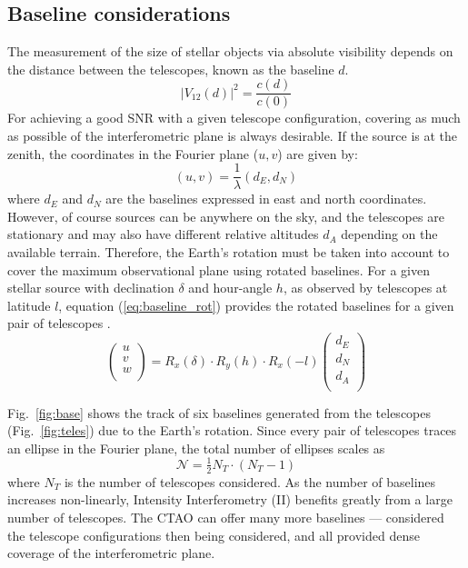 \subsection{Baseline considerations}
The measurement of the size of stellar objects via absolute visibility depends on the distance between the telescopes, known as the baseline $d$.
\begin{equation}
	|V_{12}(d)|^2 = \frac{c(d)}{c(0)}
	\label{eq:angular_size_meas}
\end{equation}
For achieving a good SNR with a given telescope configuration, covering as much as possible of the interferometric plane is always desirable. If the source is at the zenith, the coordinates in the Fourier plane ($u,v$) are given by:
\begin{equation}
	(u,v) = \frac{1}{\lambda} (d_E, d_N)
\end{equation}
where $d_E$ and $d_N$ are the baselines expressed in east and north coordinates. However, of course sources can be anywhere on the sky, and the telescopes are stationary and may also have different relative altitudes $d_A$ depending on the available terrain. Therefore, the Earth's rotation must be taken into account to cover the maximum observational plane using rotated baselines. For a given stellar source with declination $\delta$ and hour-angle $h$, as observed by telescopes at latitude $l$, equation (\ref{eq:baseline_rot}) provides the rotated baselines for a given pair of telescopes \citep[see e.g., eqs.~8--10 from][]{2020MNRAS.498.4577B}.
\begin{equation}
\begin{pmatrix} u\\ v\\ w\\ \end{pmatrix} = R_x(\delta) \cdot R_y(h) \cdot R_x(-l) \begin{pmatrix} d_E \\ d_N \\ d_A \\ \end{pmatrix}
	\label{eq:baseline_rot}
\end{equation}

Fig.~\ref{fig:base} shows the track of six baselines generated from the telescopes (Fig.~\ref{fig:teles}) due to the Earth's rotation. Since every pair of telescopes traces an ellipse in the Fourier plane, the total number of ellipses scales as
\begin{equation}
	\label{eq:N_telescopes}
	\mathcal{N} = \tfrac12 N_T \cdot (N_T -1)
\end{equation}
where $N_T$ is the number of telescopes considered.
As the number of baselines increases non-linearly, Intensity Interferometry (II) benefits greatly from a large number of telescopes. The CTAO can offer many more baselines --- \cite{2013APh....43..331D} considered the telescope configurations then being considered, and all provided dense coverage of the interferometric plane.

